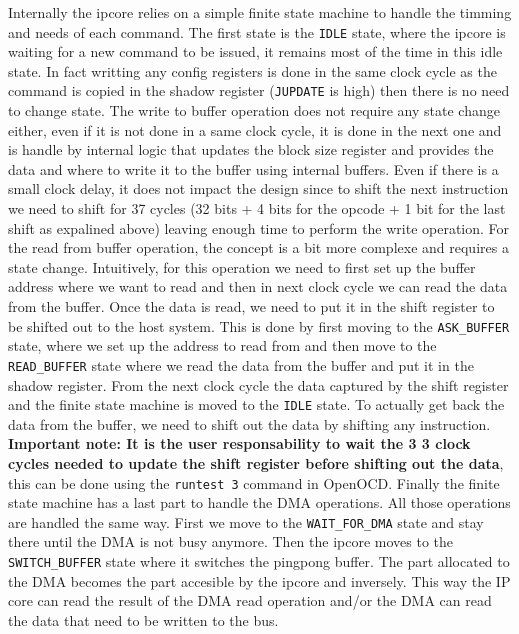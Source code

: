 \documentclass[a4paper,11pt,oneside]{report}
\begin{document}
Internally the ipcore relies on a simple finite state machine to handle the timming and needs of each command.
The first state is the \texttt{IDLE} state, where the ipcore is waiting for a new command to be issued, it remains most of the time in this idle state. In fact writting any config registers
is done in the same clock cycle as the command is copied in the shadow register (\texttt{JUPDATE} is high) then there is no need to change state.
The write to buffer operation does not require any state change either, even if it is not done in a same clock cycle, it is done in the next one and is handle by 
internal logic that updates the block size register and provides the data and where to write it to the buffer using internal buffers.
Even if there is a small clock delay, it does not impact the design since to shift the next instruction we need to shift for 37 cycles (32 bits + 4 bits for the opcode + 1 bit for the last shift as expalined above) 
leaving enough time to perform the write operation.
For the read from buffer operation, the concept is a bit more complexe and requires a state change. Intuitively, for this operation we need to first set up the buffer address where we want to read
and then in next clock cycle we can read the data from the buffer. Once the data is read, we need to put it in the shift register to be shifted out to the host system.
This is done by first moving to the \texttt{ASK_BUFFER} state, where we set up the address to read from and then move to the \texttt{READ_BUFFER} state where we read the data from the buffer and put it in the shadow register.
From the next clock cycle the data captured by the shift register and the finite state machine is moved to the \texttt{IDLE} state.
To actually get back the data from the buffer, we need to shift out the data by shifting any instruction. \textbf{Important note: It is the user responsability to wait the 3
3 clock cycles needed to update the shift register before shifting out the data}, this can be done using the \texttt{runtest 3} command in OpenOCD. 
Finally the finite state machine has a last part to handle the DMA operations. All those operations are handled the same way.
First we move to the \texttt{WAIT_FOR_DMA} state and stay there until the DMA is not busy anymore.
Then the ipcore moves to the \texttt{SWITCH_BUFFER} state where it switches the pingpong buffer. The part allocated to the DMA becomes the part accesible by the ipcore and inversely.
This way the IP core can read the result of the DMA read operation and/or the DMA can read the data that need to be written to the bus.
\end{document}
